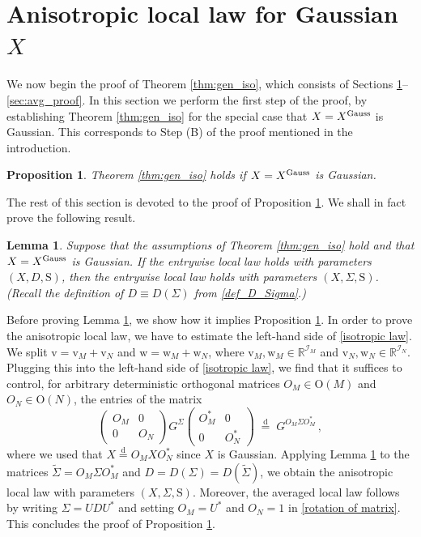 \documentclass[11pt]{article} %
\numberwithin{equation}{section}
\numberwithin{figure}{section}
\theoremstyle{plain} %
\newtheorem{lemma}[theorem]{Lemma}
\newtheorem{proposition}[theorem]{Proposition}
\theoremstyle{definition} %
\newcommand{\f}[1]{\boldsymbol{\mathrm{#1}}} %
\renewcommand{\r}{\mathrm} \newcommand{\rr}{\mathrm} %
\renewcommand{\cal}{\mathcal}
\newcommand{\wt}{\widetilde}
\newcommand{\txt}[1]{\text{\rm{#1}}}
\newcommand{\R}{\mathbb{R}}
\newcommand{\eqdist}{\overset{\text{d}}{=}}
\begin{document}
\section{Anisotropic local law for Gaussian $X$} \label{sec:iso_gauss}

We now begin the proof of Theorem \ref{thm:gen_iso}, which consists of Sections \ref{sec:iso_gauss}--\ref{sec:avg_proof}. In this section we perform the first step of the proof, by  establishing Theorem \ref{thm:gen_iso} for the special case that $X = X^{\txt{Gauss}}$ is Gaussian. This corresponds to Step (B) of the proof mentioned in the introduction.

\begin{proposition} \label{prop:Gaussian}
Theorem \ref{thm:gen_iso} holds if $X = X^{\txt{Gauss}}$ is Gaussian.
\end{proposition}

The rest of this section is devoted to the proof of Proposition \ref{prop:Gaussian}. We shall in fact prove the following result.
\begin{lemma} \label{lem:Gaussian}
Suppose that the assumptions of Theorem \ref{thm:gen_iso} hold and that $X = X^{\txt{Gauss}}$ is Gaussian.
If the entrywise local law holds with parameters $(X, D, \f S)$, then the entrywise local law holds with parameters $(X, \Sigma, \f S)$. (Recall the definition of $D \equiv D(\Sigma)$ from \eqref{def_D_Sigma}.)
\end{lemma}

Before proving Lemma \ref{lem:Gaussian}, we show how it implies Proposition \ref{prop:Gaussian}. In order to prove the anisotropic local law, we have to estimate the left-hand side of \eqref{isotropic law}. We split $\f v = \f v_M + \f v_N$ and $\f w = \f w_M + \f w_N$, where $\f v_M, \f w_M \in \R^{\cal I_M}$ and $\f v_N, \f w_N \in \R^{\cal I_N}$. Plugging this into the left-hand side of \eqref{isotropic law}, we find that it suffices to control,  for arbitrary deterministic orthogonal matrices $O_M \in \r O(M)$ and $O_N \in \r O(N)$,  the entries of the matrix
\begin{equation} \label{rotation of matrix}
\begin{pmatrix}
O_M & 0
\\
0 & O_N
\end{pmatrix}
G^\Sigma
\begin{pmatrix}
O_M^* & 0
\\
0 & O_N^*
\end{pmatrix}
\;\eqdist\; G^{O_M \Sigma O_M^*}\,,
\end{equation}
where we used that $X \eqdist O_M X O_N^*$ since $X$ is Gaussian. Applying Lemma \ref{lem:Gaussian} to the matrices $\wt \Sigma = O_M \Sigma O_M^*$ and $D = D(\Sigma) = D(\wt \Sigma)$, we obtain the anisotropic local law with parameters $(X, \Sigma, \f S)$.  Moreover, the averaged local law follows by writing $\Sigma = U D U^*$ and setting $O_M = U^*$ and $O_N = 1$ in \eqref{rotation of matrix}. This concludes the proof of Proposition \ref{prop:Gaussian}.
\end{document}
